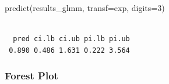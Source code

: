 \documentclass[
  letterpaper,
  DIV=11,
  numbers=noendperiod]{scrartcl}
\newenvironment{Shaded}{\begin{snugshade}}{\end{snugshade}}
\newcommand{\AttributeTok}[1]{\textcolor[rgb]{0.40,0.45,0.13}{#1}}
\newcommand{\DecValTok}[1]{\textcolor[rgb]{0.68,0.00,0.00}{#1}}
\newcommand{\FunctionTok}[1]{\textcolor[rgb]{0.28,0.35,0.67}{#1}}
\newcommand{\NormalTok}[1]{\textcolor[rgb]{0.00,0.23,0.31}{#1}}
\begin{document}
\begin{Shaded}
\begin{Highlighting}[]
\FunctionTok{predict}\NormalTok{(results\_glmm, }\AttributeTok{transf=}\NormalTok{exp, }\AttributeTok{digits=}\DecValTok{3}\NormalTok{)}
\end{Highlighting}
\end{Shaded}

\begin{verbatim}

  pred ci.lb ci.ub pi.lb pi.ub 
 0.890 0.486 1.631 0.222 3.564 
\end{verbatim}

\subsubsection{Forest Plot}\label{forest-plot-1}
\end{document}
